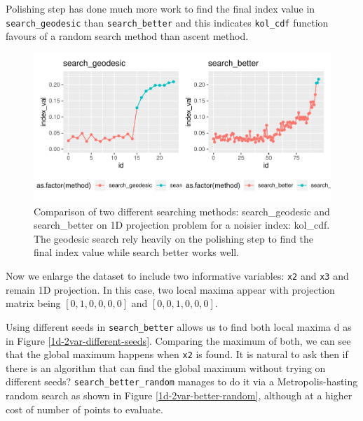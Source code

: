 \documentclass[12pt]{article}
\begin{document}
Polishing step has done much more work to find the final index value in
\texttt{search\_geodesic} than \texttt{search\_better} and this
indicates \texttt{kol\_cdf} function favours of a random search method
than ascent method.

\begin{figure}
\centering
\includegraphics{paper_files/figure-latex/kol-cdf-1.pdf}
\caption{\label{kol-cdf}Comparison of two different searching methods:
search\_geodesic and search\_better on 1D projection problem for a
noisier index: kol\_cdf. The geodesic search rely heavily on the
polishing step to find the final index value while search better works
well.}
\end{figure}

Now we enlarge the dataset to include two informative variables:
\texttt{x2} and \texttt{x3} and remain 1D projection. In this case, two
local maxima appear with projection matrix being \([0, 1, 0, 0, 0, 0]\)
and \([0, 0, 1 ,0, 0, 0]\).

Using different seeds in \texttt{search\_better} allows us to find both
local maxima d as in Figure \ref{1d-2var-different-seeds}. Comparing the
maximum of both, we can see that the global maximum happens when
\texttt{x2} is found. It is natural to ask then if there is an algorithm
that can find the global maximum without trying on different seeds?
\texttt{search\_better\_random} manages to do it via a
Metropolis-hasting random search as shown in Figure
\ref{1d-2var-better-random}, although at a higher cost of number of
points to evaluate.
\end{document}
